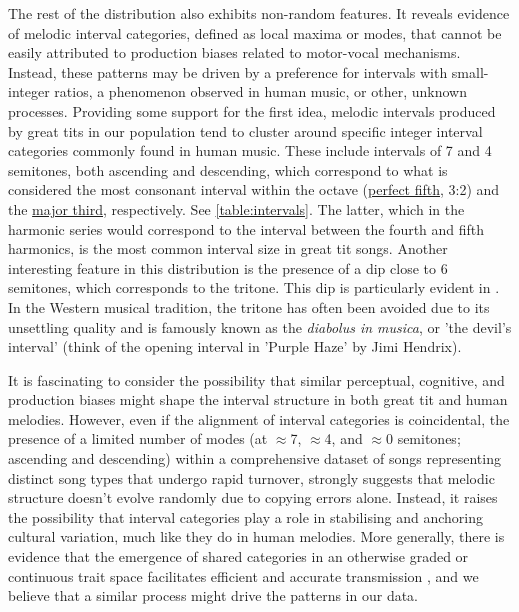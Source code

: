 The rest of the distribution also exhibits non-random features. It reveals evidence of melodic interval categories, defined as local maxima or modes, that cannot be easily attributed to production biases related to motor-vocal mechanisms. Instead, these patterns may be driven by a preference for intervals with small-integer ratios, a phenomenon observed in human music, or other, unknown processes. Providing some support for the first idea, melodic intervals produced by great tits in our population tend to cluster around specific integer interval categories commonly found in human music. These include intervals of 7 and 4 semitones, both ascending and descending, which correspond to what is considered the most consonant interval within the octave (\href{https://en.wikipedia.org/wiki/Perfect_fifth}{perfect fifth}, 3:2) and the \href{https://upload.wikimedia.org/wikipedia/commons/transcoded/2/2a/Just_major_third_on_C.mid/Just_major_third_on_C.mid.mp3}{major third}, respectively. See \autoref{table:intervals}. The latter, which in the harmonic series would correspond to the interval between the fourth and fifth harmonics, is the most common interval size in great tit songs. Another interesting feature in this distribution is the presence of a dip close to 6 semitones, which corresponds to the tritone. This dip is particularly evident in . In the Western musical tradition, the tritone has often been avoided due to its unsettling quality and is famously known as the \textit{diabolus in musica}, or 'the devil's interval' (think of the opening interval in 'Purple Haze' by Jimi Hendrix).


It is fascinating to consider the possibility that similar perceptual, cognitive, and production biases might shape the interval structure in both great tit and human melodies. However, even if the alignment of interval categories is coincidental, the presence of a limited number of modes (at $\approx$7, $\approx$4, and $\approx$0 semitones; ascending and descending) within a comprehensive dataset of songs representing distinct song types that undergo rapid turnover, strongly suggests that melodic structure doesn't evolve randomly due to copying errors alone. Instead, it raises the possibility that interval categories play a role in stabilising and anchoring cultural variation, much like they do in human melodies. More generally, there is evidence that the emergence of shared categories in an otherwise graded or continuous trait space facilitates efficient and accurate transmission  \autocite{falandays2022, tchernichovski2017, silvey2019, decastro-arrazola2019, kirby2017}, and we believe that a similar process might drive the patterns in our data.

